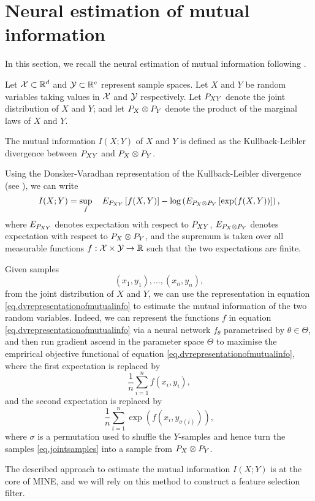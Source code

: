 \section{Neural estimation of mutual information}
\label{sec.mine}

In this section,
we recall the neural estimation of mutual information
following
\cite{BBROBCH18mut}.




Let 
$\mathcal{X} \subset \mathbb{R}^{d}$
and 
$\mathcal{Y} \subset \mathbb{R}^{e}$
represent sample spaces.
Let 
$X$
and 
$Y$
be random variables taking values in 
$\mathcal{X}$
and 
$\mathcal{Y}$
respectively.
Let 
${{P}}_{XY}$ 
denote the joint distribution of 
$X$
and
$Y$; 
and let 
${{P}}_{X} \otimes {{P}}_{Y}$
denote the
product of the marginal
laws of $X$ and $Y$.

The mutual information 
$I(X; Y)$
of 
$X$ 
and 
$Y$
is defined as the 
Kullback-Leibler
divergence 
between
${{P}}_{XY}$ 
and
${{P}}_{X} \otimes {{P}}_{Y}$.

Using the Donsker-Varadhan representation of the 
Kullback-Leibler
divergence 
(see \cite{DV83asy}),
we can write
\begin{equation}
	\label{eq.dvrepresentationofmutualinfo}
	I(X; Y)
	= 
	\sup_{f}
	\quad
	{{E}}_{{{P}}_{XY}}
	\left[
		f(X, Y)
	\right]
        - \log
	\left(
	{{E}}_{{{P}}_{X} \otimes {{P}}_{Y}}
	\left[
		\exp(f(X, Y))
	\right]
	\right),
\end{equation}
where 
${{E}}_{{{P}}_{XY}}$ 
denotes expectation with respect to 
${{P}}_{XY}$,
${{E}}_{{{P}}_{X} \otimes {{P}}_{Y}}$ 
denotes expectation with respect to 
${{P}}_{X} \otimes {{P}}_{Y}$,
and
the supremum is taken over 
all measurable functions 
$f: \mathcal{X} \times \mathcal{Y} \rightarrow \mathbb{R}$ 
such that the two expectations are finite.

Given samples 
\begin{equation}
	\label{eq.jointsamples}
	(x_1, y_1), 
	\dots,
	(x_n, y_n), 
\end{equation}
from the joint distribution of $X$ and $Y$,
we can use the representation
in equation \eqref{eq.dvrepresentationofmutualinfo}
to 
estimate the mutual information of the two random variables.
Indeed,
we can  represent the functions
$f$
in equation \eqref{eq.dvrepresentationofmutualinfo}
via a neural network 
$f_\theta$ 
parametrised by $\theta \in \Theta$,
and then 
run gradient ascend in the parameter space $\Theta$ to
maximise 
the emprirical objective functional of equation \eqref{eq.dvrepresentationofmutualinfo}, 
where
the first expectation is replaced by 
\begin{equation*}
	\frac{1}{n}\sum_{i=1}^{n} f(x_i, y_i),
\end{equation*}
and the second expectation is replaced by 
\begin{equation*}
	\frac{1}{n}\sum_{i=1}^{n} \exp\left(
	f(x_i, y_{\sigma(i)})
	\right),
\end{equation*}
where $\sigma$ is a permutation 
used to shuffle 
the $Y$-samples 
and 
hence turn the samples \eqref{eq.jointsamples}
into a sample from 
${{P}}_{X} \otimes {{P}}_{Y}$.

The described approach to 
estimate the mutual information 
$I(X; Y)$
is at the core of MINE, 
and we will rely on this method 
to construct a feature selection filter. 








